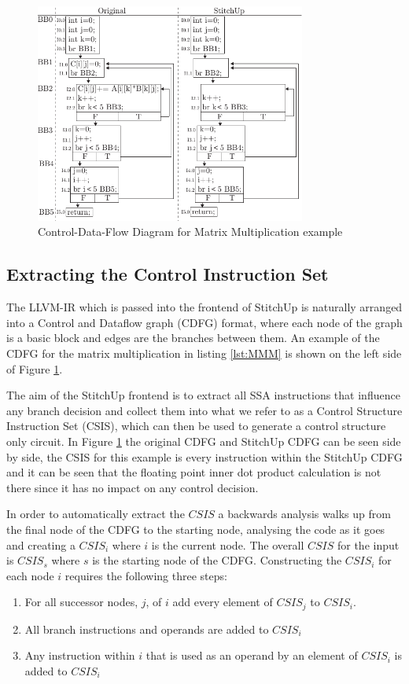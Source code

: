 \begin{figure}[t]
\centering
\includegraphics[width=3.5in]{./imgs/mmm_cdfg_v2.pdf}
\caption{Control-Data-Flow Diagram for Matrix Multiplication example}
\label{fig:mmm_cdfg}
\end{figure}

\subsection{Extracting the Control Instruction Set}
The LLVM-IR which is passed into the frontend of StitchUp is naturally arranged into a Control and Dataflow graph (CDFG) format,
where each node of the graph is a basic block and edges are the branches between them.
An example of the CDFG for the matrix multiplication in listing \ref{lst:MMM}
is shown on the left side of Figure \ref{fig:mmm_cdfg}.

The aim of the StitchUp frontend is to extract all SSA instructions that influence any branch decision and collect them into what
we refer to as a Control Structure Instruction Set (CSIS), which can then be used to generate a control structure only circuit.
In Figure \ref{fig:mmm_cdfg} the original CDFG and StitchUp CDFG can be seen side by side, the CSIS for this example
is every instruction within the StitchUp CDFG and it can be seen that the floating point inner dot product calculation
is not there since it has no impact on any control decision.

In order to automatically extract the $CSIS$ a backwards analysis walks up from the final node of the CDFG to the starting node, analysing
the code as it goes and creating a $CSIS_{i}$ where $i$ is the current node.
The overall $CSIS$ for the input is $CSIS_s$ where $s$ is the starting node of the CDFG.
Constructing the $CSIS_i$ for each node $i$ requires the following three steps:
\begin{enumerate}
    \item For all successor nodes, $j$, of $i$ add every element of $CSIS_j$ to $CSIS_i$.
    \item All branch instructions and operands are added to $CSIS_i$
    \item Any instruction within $i$ that is used as an operand by an element of $CSIS_i$ is added to $CSIS_i$
\end{enumerate}

